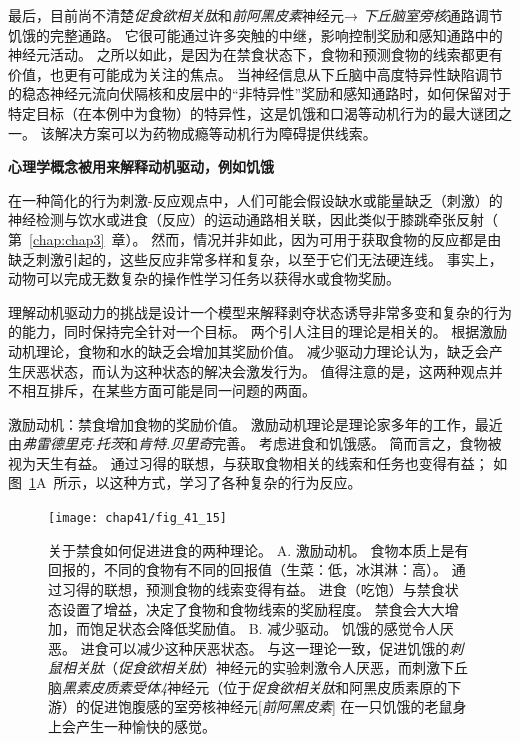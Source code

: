 最后，目前尚不清楚\textit{促食欲相关肽}和\textit{前阿黑皮素}神经元→ \textit{下丘脑室旁核}通路调节饥饿的完整通路。
它很可能通过许多突触的中继，影响控制奖励和感知通路中的神经元活动。
之所以如此，是因为在禁食状态下，食物和预测食物的线索都更有价值，也更有可能成为关注的焦点。
当神经信息从下丘脑中高度特异性缺陷调节的稳态神经元流向伏隔核和皮层中的“非特异性”奖励和感知通路时，如何保留对于特定目标（在本例中为食物）的特异性，这是饥饿和口渴等动机行为的最大谜团之一。
该解决方案可以为药物成瘾等动机行为障碍提供线索。


\textbf{心理学概念被用来解释动机驱动，例如饥饿}

在一种简化的行为刺激-反应观点中，人们可能会假设缺水或能量缺乏（刺激）的神经检测与饮水或进食（反应）的运动通路相关联，因此类似于膝跳牵张反射（ 第~\ref{chap:chap3}~章）。
然而，情况并非如此，因为可用于获取食物的反应都是由缺乏刺激引起的，这些反应非常多样和复杂，以至于它们无法硬连线。
事实上，动物可以完成无数复杂的操作性学习任务以获得水或食物奖励。


理解动机驱动力的挑战是设计一个模型来解释剥夺状态诱导非常多变和复杂的行为的能力，同时保持完全针对一个目标。 两个引人注目的理论是相关的。
根据激励动机理论，食物和水的缺乏会增加其奖励价值。
减少驱动力理论认为，缺乏会产生厌恶状态，而认为这种状态的解决会激发行为。
值得注意的是，这两种观点并不相互排斥，在某些方面可能是同一问题的两面。


激励动机：禁食增加食物的奖励价值。
激励动机理论是理论家多年的工作，最近由\textit{弗雷德里克$\cdot$托茨}和\textit{肯特.贝里奇}完善。
考虑进食和饥饿感。
简而言之，食物被视为天生有益。
通过习得的联想，与获取食物相关的线索和任务也变得有益；
如图~\ref{fig:41_15}A~所示，以这种方式，学习了各种复杂的行为反应。


\begin{figure}[htbp]
	\centering
	\texttt{[image: chap41/fig\_41\_15]}
	\caption{关于禁食如何促进进食的两种理论。 
		A. 激励动机。
		食物本质上是有回报的，不同的食物有不同的回报值（生菜：低，冰淇淋：高）。
		通过习得的联想，预测食物的线索变得有益。 进食（吃饱）与禁食状态设置了增益，决定了食物和食物线索的奖励程度。
		禁食会大大增加，而饱足状态会降低奖励值。
		B. 减少驱动。
		饥饿的感觉令人厌恶。
		进食可以减少这种厌恶状态。
		与这一理论一致，促进饥饿的\textit{刺鼠相关肽}（\textit{促食欲相关肽}）神经元的实验刺激令人厌恶，而刺激下丘脑\textit{黑素皮质素受体4}神经元（位于\textit{促食欲相关肽}和阿黑皮质素原的下游）的促进饱腹感的室旁核神经元[\textit{前阿黑皮素}] 在一只饥饿的老鼠身上会产生一种愉快的感觉。}
	\label{fig:41_15}
\end{figure}


